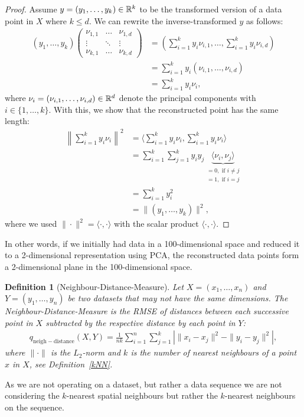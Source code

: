 \documentclass[pdftex,12pt,a4paper]{report}
\newtheorem{definition}{Definition}[section]
\newcommand\norm[1]{\left\lVert#1\right\rVert}
\begin{document}
\begin{proof}
    Assume $y = (y_1, \dots, y_k) \in \mathbb{R}^k$ to be the transformed version of a data point in $X$ where $k \leq d$.
    We can rewrite the inverse-transformed $y$ as follows:
    \begin{align*}
        (y_1, \dots, y_k) 
        \begin{pmatrix}
            \nu_{1,1} & \dots & \nu_{1,d} \\
            \vdots & \ddots & \vdots \\
            \nu_{k,1} & \dots & \nu_{k,d}
        \end{pmatrix}
        & = \left( \sum_{i=1}^k y_i \nu_{i,1}, \dots, \sum_{i=1}^k y_i \nu_{i,d} \right) \\
        & = \sum_{i = 1}^k y_i (\nu_{i,1}, \dots, \nu_{i,d}) \\
        & = \sum_{i = 1}^k y_i \nu_i,
    \end{align*}
    where $\nu_i = (\nu_{i,1}, \dots, \nu_{i,d}) \in \mathbb{R}^d$ denote the principal components with $i \in \{1, \dots, k\}$.
    With this, we show that the reconstructed point has the same length:
    \begin{align*}
        \norm{\sum_{i = 1}^k y_i \nu_i} ^2 
        & = \Biggl \langle \sum_{i = 1}^k y_i \nu_i, \sum_{i = 1}^k y_i \nu_i  \Biggl \rangle \\
        &=  \sum_{i=1}^k \sum_{j=1}^k y_i y_j \underbrace{\langle \nu_i, \nu_j \rangle}_{\substack{= 0, \text{ if } i \neq j \\ = 1, \text{ if } i = j}} \\
        & = \sum_{i=1}^k y_i^2 \\
        & = \| (y_1, \dots, y_k) \|^2,
    \end{align*}
    where we used $\| \cdot \|^2 = \langle \cdot, \cdot \rangle$ with the scalar product $ \langle \cdot, \cdot \rangle$.
\end{proof}
In other words, if we initially had data in a 100-dimensional space and reduced it to a 2-dimensional representation using PCA, the reconstructed data points form a 2-dimensional plane in the 100-dimensional space.

\begin{definition}[Neighbour-Distance-Measure] \label{Neighbour-Distance-Measure}
    Let $X = (x_1, \dots, x_n)$ and $Y=(y_1, \dots, y_n)$ be two datasets that may not have the same dimensions.
    The Neighbour-Distance-Measure is the RMSE of distances between each successive point in $X$ subtracted by the respective distance by each point in $Y$:
    \begin{align*}
        q_{\mathrm{neigh-distance}} (X,Y) = \frac{1}{nk} \sum_{i=1}^n \sum_{{j=1}}^k \left| \|x_i - x_j\|^2 - \|y_i - y_j\|^2 \right|,
    \end{align*}
    where $\| \cdot \|$ is the $L_2$-norm and $k$ is the number of nearest neighbours of a point $x$ in $X$, see Definition~\ref{kNN}.
\end{definition}
As we are not operating on a dataset, but rather a data sequence we are not considering the $k$-nearest spatial neighbours but rather the $k$-nearest neighbours on the sequence.
\end{document}
